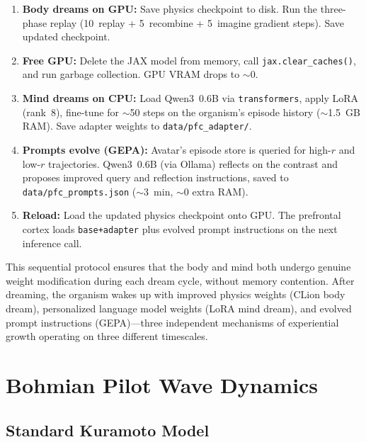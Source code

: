 \documentclass[11pt,a4paper,twocolumn]{article}
\begin{document}
\begin{enumerate}
\item \textbf{Body dreams on GPU:} Save physics checkpoint to disk. Run the three-phase replay (10~replay + 5~recombine + 5~imagine gradient steps). Save updated checkpoint.
\item \textbf{Free GPU:} Delete the JAX model from memory, call \texttt{jax.clear\_caches()}, and run garbage collection. GPU VRAM drops to $\sim$0.
\item \textbf{Mind dreams on CPU:} Load Qwen3~0.6B via \texttt{transformers}, apply LoRA (rank~8), fine-tune for $\sim$50 steps on the organism's episode history ($\sim$1.5~GB RAM). Save adapter weights to \texttt{data/pfc\_adapter/}.
\item \textbf{Prompts evolve (GEPA):} Avatar's episode store is queried for high-$r$ and low-$r$ trajectories. Qwen3~0.6B (via Ollama) reflects on the contrast and proposes improved query and reflection instructions, saved to \texttt{data/pfc\_prompts.json} ($\sim$3~min, $\sim$0 extra RAM).
\item \textbf{Reload:} Load the updated physics checkpoint onto GPU. The prefrontal cortex loads \texttt{base+adapter} plus evolved prompt instructions on the next inference call.
\end{enumerate}

This sequential protocol ensures that the body and mind both undergo genuine weight modification during each dream cycle, without memory contention. After dreaming, the organism wakes up with improved physics weights (CLion body dream), personalized language model weights (LoRA mind dream), and evolved prompt instructions (GEPA)---three independent mechanisms of experiential growth operating on three different timescales.

\section{Bohmian Pilot Wave Dynamics}

\subsection{Standard Kuramoto Model}
\end{document}
